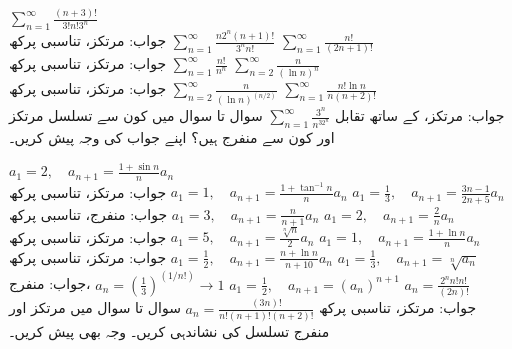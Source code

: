 $\sum\limits_{n=1}^{\infty}\frac{(n+3)!}{3!n!3^n}$\\
جواب:\quad
مرتکز، تناسبی پرکھ
$\sum\limits_{n=1}^{\infty}\frac{n2^n(n+1)!}{3^nn!}$
$\sum\limits_{n=1}^{\infty}\frac{n!}{(2n+1)!}$\\
جواب:\quad
مرتکز، تناسبی پرکھ
$\sum\limits_{n=1}^{\infty}\frac{n!}{n^n}$
$\sum\limits_{n=2}^{\infty}\frac{n}{(\ln n)^n}$\\
جواب:\quad
مرتکز، تناسبی پرکھ
$\sum\limits_{n=2}^{\infty}\frac{n}{(\ln n)^{(n/2)}}$
$\sum\limits_{n=1}^{\infty}\frac{n!\ln n}{n(n+2)!}$\\
جواب:\quad
مرتکز،  کے ساتھ تقابل
$\sum\limits_{n=1}^{\infty}\frac{3^n}{n^32^n}$
سوال  تا سوال  میں کون سے تسلسل مرتکز اور کون سے منفرج ہیں؟ اپنے جواب کی وجہ پیش کریں۔

$a_1=2,\quad a_{n+1}=\tfrac{1+\sin n}{n}a_n$\\
جواب:\quad
مرتکز، تناسبی پرکھ
$a_1=1,\quad a_{n+1}=\frac{1+\tan^{-1}n}{n}a_n$
$a_1=\tfrac{1}{3},\quad a_{n+1}=\tfrac{3n-1}{2n+5}a_n$\\
جواب:\quad
منفرج، تناسبی پرکھ
$a_1=3,\quad a_{n+1}=\tfrac{n}{n+1}a_n$
$a_1=2,\quad a_{n+1}=\tfrac{2}{n}a_n$\\
جواب:\quad
مرتکز، تناسبی پرکھ
$a_1=5,\quad a_{n+1}=\tfrac{\sqrt[n]{n}}{2}a_n$
$a_1=1,\quad a_{n+1}=\tfrac{1+\ln n}{n}a_n$\\
جواب:\quad
مرتکز، تناسبی پرکھ
$a_1=\tfrac{1}{2},\quad a_{n+1}=\tfrac{n+\ln n}{n+10}a_n$
$a_1=\tfrac{1}{3},\quad a_{n+1}=\sqrt[n]{a_n}$\\
جواب:\quad
منفرج، 
$a_n=(\tfrac{1}{3})^{(1/n!)}\to 1$
$a_1=\tfrac{1}{2},\quad a_{n+1}=(a_n)^{n+1}$
$a_n=\tfrac{2^nn!n!}{(2n)!}$\\
جواب:\quad
مرتکز، تناسبی پرکھ
$a_n=\tfrac{(3n)!}{n!(n+1)!(n+2)!}$
سوال  تا سوال  میں مرتکز اور منفرج تسلسل کی نشاندہی کریں۔ وجہ بھی پیش کریں۔ 

